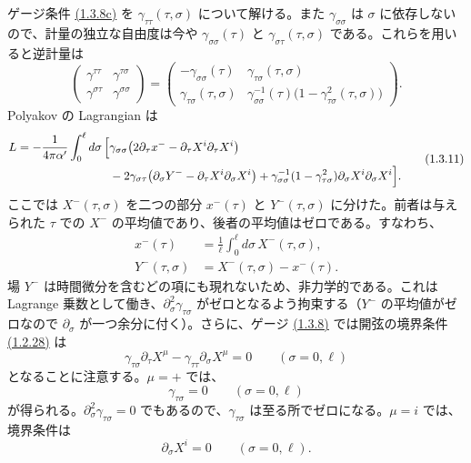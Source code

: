 ゲージ条件 \hyperref[eq:1.3.8c]{(1.3.8c)} を $\gamma_{\tau\tau}(\tau,\sigma)$ について解ける。また $\gamma_{\sigma\sigma}$ は $\sigma$ に依存しないので、計量の独立な自由度は今や $\gamma_{\sigma\sigma}(\tau)$ と $\gamma_{\sigma\tau}(\tau,\sigma)$ である。これらを用いると逆計量は
\begin{equation}
\begin{pmatrix}
\gamma^{\tau\tau}&\gamma^{\tau\sigma}\\
\gamma^{\sigma\tau}&\gamma^{\sigma\sigma}
\end{pmatrix}
=
\begin{pmatrix}
-\gamma_{\sigma\sigma}(\tau)&\gamma_{\tau\sigma}(\tau,\sigma)\\
\gamma_{\tau\sigma}(\tau,\sigma)&
\gamma_{\sigma\sigma}^{-1}(\tau)\bigl(1-\gamma_{\tau\sigma}^2(\tau,\sigma)\bigr)
\end{pmatrix}.
\tag{1.3.10}\label{eq:1.3.10}
\end{equation}
Polyakov の Lagrangian は
\begin{equation}
\begin{aligned}
L=-\frac{1}{4\pi\alpha'}\int_0^\ell d\sigma\,
\Bigl[&\gamma_{\sigma\sigma}
\bigl(2\partial_\tau x^--\partial_\tau X^i\partial_\tau X^i\bigr)\\
&-2\gamma_{\sigma\tau}
\bigl(\partial_\sigma Y^--\partial_\tau X^i\partial_\sigma X^i\bigr)
+\gamma_{\sigma\sigma}^{-1}(1-\gamma_{\tau\sigma}^2)
\partial_\sigma X^i\partial_\sigma X^i\Bigr].
\end{aligned}
\tag{1.3.11}\label{eq:1.3.11}
\end{equation}
ここでは $X^-(\tau,\sigma)$ を二つの部分 $x^-(\tau)$ と $Y^-(\tau,\sigma)$ に分けた。前者は与えられた $\tau$ での $X^-$ の平均値であり、後者の平均値はゼロである。すなわち、
\begin{align}
x^-(\tau)&=\frac{1}{\ell}\int_0^\ell d\sigma\,X^-(\tau,\sigma),
\tag{1.3.12a}\label{eq:1.3.12a}\\
Y^-(\tau,\sigma)&=X^-(\tau,\sigma)-x^-(\tau).
\tag{1.3.12b}\label{eq:1.3.12b}
\end{align}
場 $Y^-$ は時間微分を含むどの項にも現れないため、非力学的である。これは Lagrange 乗数として働き、$\partial_\sigma^2\gamma_{\tau\sigma}$ がゼロとなるよう拘束する（$Y^-$ の平均値がゼロなので $\partial_\sigma$ が一つ余分に付く）。さらに、ゲージ \hyperref[eq:1.3.8a]{(1.3.8)} では開弦の境界条件 \hyperref[eq:1.2.28]{(1.2.28)} は
\begin{equation}
\gamma_{\tau\sigma}\partial_\tau X^\mu
-\gamma_{\tau\tau}\partial_\sigma X^\mu=0
\qquad (\sigma=0,\ell)
\tag{1.3.13}\label{eq:1.3.13}
\end{equation}
となることに注意する。$\mu=+$ では、
\begin{equation}
\gamma_{\tau\sigma}=0\qquad (\sigma=0,\ell)
\tag{1.3.14}\label{eq:1.3.14}
\end{equation}
が得られる。$\partial_\sigma^2\gamma_{\tau\sigma}=0$ でもあるので、$\gamma_{\tau\sigma}$ は至る所でゼロになる。$\mu=i$ では、境界条件は
\begin{equation}
\partial_\sigma X^i=0\qquad (\sigma=0,\ell).
\tag{1.3.15}\label{eq:1.3.15}
\end{equation}

